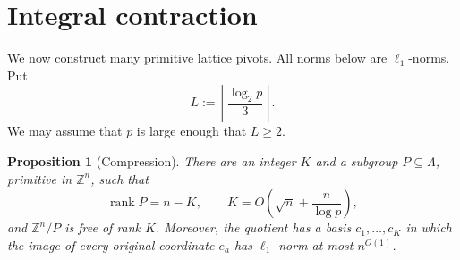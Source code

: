 \documentclass[10pt]{article}
\newtheorem{proposition}[theorem]{Proposition}
\theoremstyle{definition}
\begin{document}
\section{Integral contraction}

We now construct many primitive lattice pivots.  All norms below are
$\ell_1$-norms.  Put
\[
    L:=\left\lfloor\frac{\log_2 p}{3}\right\rfloor.
\]
We may assume that $p$ is large enough that $L\ge 2$.

\begin{proposition}[Compression]
There are an integer $K$ and a subgroup $P\subseteq\Lambda$, primitive in
$\mathbb Z^n$, such that
\[
    \operatorname{rank}P=n-K,
    \qquad
    K=O\!\left(\sqrt n+\frac{n}{\log p}\right),
\]
and $\mathbb Z^n/P$ is free of rank $K$.  Moreover, the quotient has a basis
$c_1,\ldots,c_K$ in which the image of every original coordinate $e_a$ has
$\ell_1$-norm at most $n^{O(1)}$.
\end{proposition}
\end{document}
